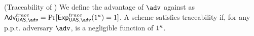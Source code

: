 
\begin{definition}{(Traceability of \UAS)}
  We define the advantage \AdvTrace of $\adv$ against \ExpTrace as
  $\AdvTrace=\Pr\lbrack\ExpTrace(1^\secpar)=1\rbrack$.
  A \UAS scheme satisfies traceability if, for any p.p.t. adversary $\adv$,
  \AdvTrace is a negligible function of $1^\kappa$.
\end{definition}

